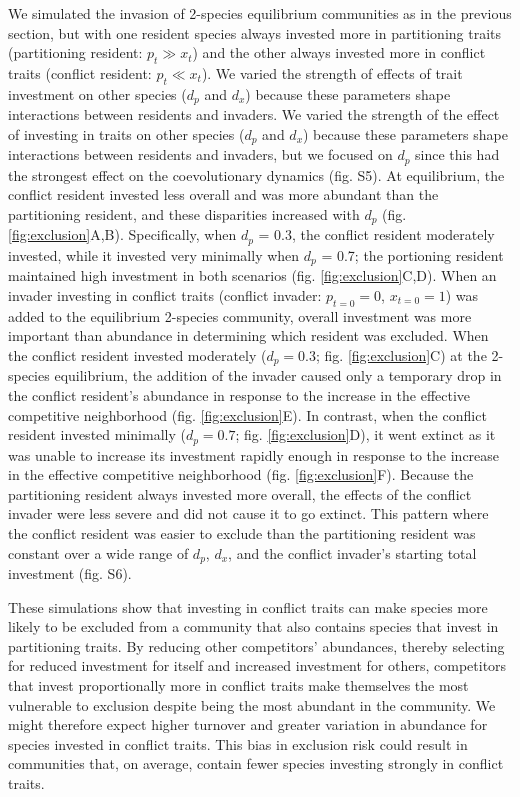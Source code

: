 We simulated the invasion of 2-species equilibrium communities as in the
previous section, but with one resident species always invested more in
partitioning traits (partitioning resident: $p_t \gg x_t$) and the other 
always invested more in conflict traits (conflict resident: $p_t \ll x_t$). 
We varied the strength of effects of
trait investment on other species ($d_{p}$ and $d_{x}$) because
these parameters shape interactions between residents and invaders.
We varied the strength of the effect of investing in traits on other species
($d_{p}$ and $d_{x}$) because these parameters shape interactions between
residents and invaders, but we focused on $d_p$ since this had the strongest
effect on the coevolutionary dynamics (fig. S5). 
At equilibrium, the conflict resident invested less overall and was more
abundant than the partitioning resident, and these disparities increased with
$d_p$ (fig. \ref{fig:exclusion}A,B). Specifically, when $d_p$ = 0.3, the
conflict resident moderately invested, while it invested very minimally when
$d_p$ = 0.7; the portioning resident maintained high investment in both
scenarios (fig. \ref{fig:exclusion}C,D). When an invader investing in conflict
traits (conflict invader: $p_{t=0} = 0$, $x_{t=0} = 1$) was added to the
equilibrium 2-species community, overall investment was more important than
abundance in determining which resident was excluded.
When the conflict resident invested moderately ($d_p=0.3$;
fig. \ref{fig:exclusion}C) at the 2-species equilibrium, the addition of the
invader caused only a temporary drop in the conflict resident’s abundance in
response to the increase in the effective competitive neighborhood (fig.
\ref{fig:exclusion}E). In contrast, when the conflict resident invested
minimally ($d_p=0.7$; fig. \ref{fig:exclusion}D), it went extinct as it was
unable to increase its investment rapidly enough in response to the increase in
the effective competitive neighborhood (fig. \ref{fig:exclusion}F).
Because the partitioning resident always
invested more overall, the effects of the conflict invader were less
severe and did not cause it to go extinct. This pattern where the
conflict resident was easier to exclude than the partitioning resident
was constant over a wide range of $d_{p}$, $d_{x}$, and the conflict
invader's starting total investment (fig. S6).


These simulations show that investing in conflict traits can make
species more likely to be excluded from a community that also contains
species that invest in partitioning traits. By reducing other
competitors' abundances, thereby selecting for reduced investment for
itself and increased investment for others, competitors that invest
proportionally more in conflict traits make themselves the most vulnerable to
exclusion despite being the most abundant in the community. We might
therefore expect higher turnover and greater variation in abundance for
species invested in conflict traits. This bias in exclusion risk could
result in communities that, on average, contain fewer species investing
strongly in conflict traits.

